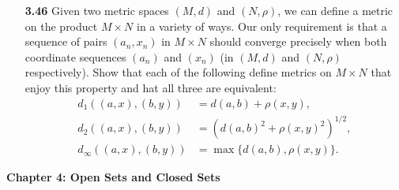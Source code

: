 \documentclass[12pt]{amsart}
\begin{document}
\begin{enumerate}
\item[\bf 3.46] Given two metric spaces $(M,d)$ and $(N, \rho)$, we can define a metric on the product $M\times N$ in a variety of ways. Our only requirement is that a sequence of pairs $(a_n, x_n)$ in $M\times N$ should converge precisely when both coordinate sequences $(a_n)$ and $(x_n)$ (in $(M, d)$ and $(N,\rho)$ respectively). Show that each of the following define metrics on $M\times N$ that enjoy this property and hat all three are equivalent: 
\medskip
\begin{equation*}
\begin{split}
d_1\left( (a,x),(b,y) \right) &= d(a,b)+\rho(x,y), \\
d_2\left( (a,x),(b,y) \right) &= \left(d(a,b)^2+\rho(x,y)^2\right)^{1/2}, \\
d_\infty\left( (a,x),(b,y) \right) &= \max\{ d(a,b),\rho(x,y) \}.
\end{split}
\end{equation*}

\bigskip
\end{enumerate}

{\bf Chapter 4: Open Sets and Closed Sets}
\end{document}

